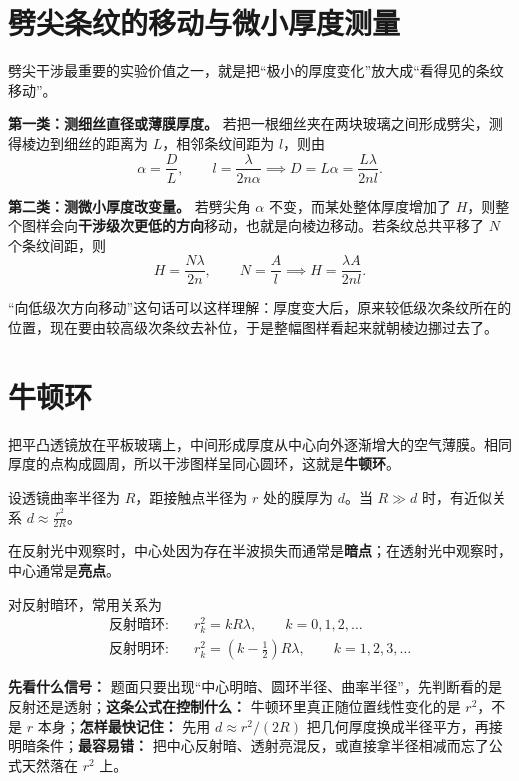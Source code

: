 \documentclass[lang=cn,11pt]{elegantbook}
\begin{document}
\section{劈尖条纹的移动与微小厚度测量}

劈尖干涉最重要的实验价值之一，就是把“极小的厚度变化”放大成“看得见的条纹移动”。

\textbf{第一类：测细丝直径或薄膜厚度。} 若把一根细丝夹在两块玻璃之间形成劈尖，测得棱边到细丝的距离为 \(L\)，相邻条纹间距为 \(l\)，则由
\[
\alpha=\frac{D}{L},\qquad
l=\frac{\lambda}{2n\alpha}
\implies
D=L\alpha=\frac{L\lambda}{2nl}.
\]

\textbf{第二类：测微小厚度改变量。} 若劈尖角 \(\alpha\) 不变，而某处整体厚度增加了 \(H\)，则整个图样会向\textbf{干涉级次更低的方向}移动，也就是向棱边移动。若条纹总共平移了 \(N\) 个条纹间距，则
\[
H=\frac{N\lambda}{2n},\qquad
N=\frac{A}{l}
\implies
H=\frac{\lambda A}{2nl}.
\]

\begin{note}
“向低级次方向移动”这句话可以这样理解：厚度变大后，原来较低级次条纹所在的位置，现在要由较高级次条纹去补位，于是整幅图样看起来就朝棱边挪过去了。
\end{note}

\section{牛顿环}

把平凸透镜放在平板玻璃上，中间形成厚度从中心向外逐渐增大的空气薄膜。相同厚度的点构成圆周，所以干涉图样呈同心圆环，这就是\textbf{牛顿环}。

设透镜曲率半径为 \(R\)，距接触点半径为 \(r\) 处的膜厚为 \(d\)。当 \(R\gg d\) 时，有近似关系 \(d\approx \frac{r^2}{2R}\)。

在反射光中观察时，中心处因为存在半波损失而通常是\textbf{暗点}；在透射光中观察时，中心通常是\textbf{亮点}。

对反射暗环，常用关系为
\[
\begin{aligned}
\text{反射暗环:}\quad &r_k^2=kR\lambda,\qquad k=0,1,2,\dots\\
\text{反射明环:}\quad &r_k^2=\left(k-\frac12\right)R\lambda,\qquad k=1,2,3,\dots
\end{aligned}
\]

\begin{note}
\textbf{先看什么信号：} 题面只要出现“中心明暗、圆环半径、曲率半径”，先判断看的是反射还是透射；\textbf{这条公式在控制什么：} 牛顿环里真正随位置线性变化的是 \(r^2\)，不是 \(r\) 本身；\textbf{怎样最快记住：} 先用 \(d\approx r^2/(2R)\) 把几何厚度换成半径平方，再接明暗条件；\textbf{最容易错：} 把中心反射暗、透射亮混反，或直接拿半径相减而忘了公式天然落在 \(r^2\) 上。
\end{note}
\end{document}
